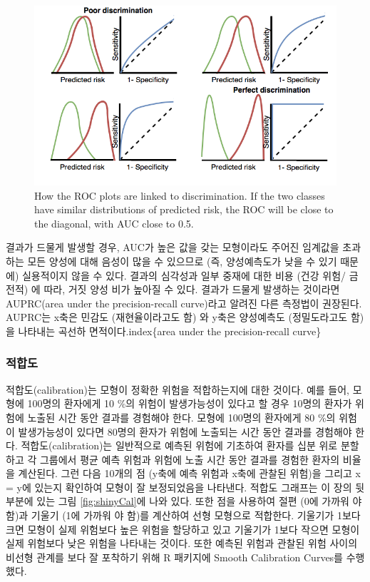 \documentclass[11pt]{book}
\theoremstyle{definition}
\theoremstyle{definition}
\theoremstyle{definition}
\theoremstyle{remark}
\begin{document}
\begin{figure}
\includegraphics[width=1\linewidth]{images/PatientLevelPrediction/theory/roctheory} \caption{How the ROC plots are linked to discrimination. If the two classes have similar distributions of predicted risk, the ROC will be close to the diagonal, with AUC close to 0.5.}\label{fig:figuretheoryroctheory}
\end{figure}

결과가 드물게 발생할 경우, AUC가 높은 값을 갖는 모형이라도 주어진
임계값을 초과하는 모든 양성에 대해 음성이 많을 수 있으므로 (즉,
양성예측도가 낮을 수 있기 때문에) 실용적이지 않을 수 있다. 결과의
심각성과 일부 중재에 대한 비용 (건강 위험/ 금전적) 에 따라, 거짓 양성
비가 높아질 수 있다. 결과가 드물게 발생하는 것이라면 AUPRC(area under
the precision-recall curve)라고 알려진 다른 측정법이 권장된다. AUPRC는
x축은 민감도 (재현율이라고도 함) 와 y축은 양성예측도 (정밀도라고도 함)
을 나타내는 곡선하 면적이다.index\{area under the precision-recall
curve\}

\subsubsection*{적합도}

적합도(calibration)는 모형이 정확한 위험을 적합하는지에 대한 것이다.
예를 들어, 모형에 100명의 환자에게 10 \%의 위험이 발생가능성이 있다고 할
경우 10명의 환자가 위험에 노출된 시간 동안 결과를 경험해야 한다. 모형에
100명의 환자에게 80 \%의 위험이 발생가능성이 있다면 80명의 환자가 위험에
노출되는 시간 동안 결과를 경험해야 한다. 적합도(calibration)는
일반적으로 예측된 위험에 기초하여 환자를 십분 위로 분할하고 각 그룹에서
평균 예측 위험과 위험에 노출 시간 동안 결과를 경험한 환자의 비율을
계산된다. 그런 다음 10개의 점 (y축에 예측 위험과 x축에 관찰된 위험)을
그리고 x = y에 있는지 확인하여 모형이 잘 보정되었음을 나타낸다. 적합도
그래프는 이 장의 뒷부분에 있는 그림 \ref{fig:shinyCal}에 나와 있다. 또한
점을 사용하여 절편 (0에 가까워 야 함)과 기울기 (1에 가까워 야 함)를
계산하여 선형 모형으로 적합한다. 기울기가 1보다 크면 모형이 실제
위험보다 높은 위험을 할당하고 있고 기울기가 1보다 작으면 모형이 실제
위험보다 낮은 위험을 나타내는 것이다. 또한 예측된 위험과 관찰된 위험
사이의 비선형 관계를 보다 잘 포착하기 위해 R 패키지에 Smooth Calibration
Curves를 수행했다.
\end{document}
